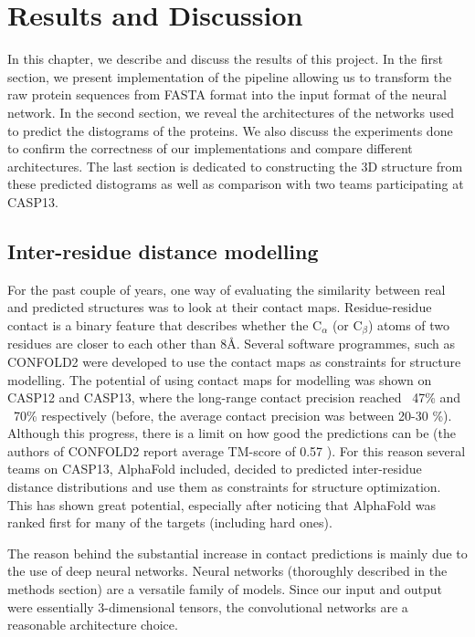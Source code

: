 \chapter{Results and Discussion}
In this chapter, we describe and discuss the results of this project.
In the first section, we present implementation of the pipeline allowing us to transform the raw protein sequences from FASTA format into the input format of the neural network.
In the second section, we reveal the architectures of the networks used to predict the distograms of the proteins.
We also discuss the experiments done to confirm the correctness of our implementations and compare different architectures.
The last section is dedicated to constructing the 3D structure from these predicted distograms as well as comparison with two teams participating at CASP13.



\newpage
\section{Inter-residue distance modelling}

For the past couple of years, one way of evaluating the similarity between real and predicted structures was to look at their contact maps. 
Residue-residue contact is a binary feature that describes whether the C$_\alpha$ (or C$_\beta$) atoms of two residues are closer to each other than 8\AA. 
Several software programmes, such as CONFOLD2 \cite{confold, confold2} were developed to use the contact maps as constraints for structure modelling. 
The potential of using contact maps for modelling was shown on CASP12 and CASP13, where the long-range contact precision reached ~47\% and ~70\% respectively (before, the average contact precision was between 20-30 \%). 
Although this progress, there is a limit on how good the predictions can be (the authors of CONFOLD2 report average TM-score of 0.57 \cite{confold2}). 
For this reason several teams on CASP13, AlphaFold included, decided to predicted inter-residue distance distributions and use them as constraints for structure optimization. 
This has shown great potential, especially after noticing that AlphaFold was ranked first for many of the targets (including hard ones).

The reason behind the substantial increase in contact predictions is mainly due to the use of deep neural networks. 
Neural networks (thoroughly described in the methods section) are a versatile family of models. 
Since our input and output were essentially 3-dimensional tensors, the convolutional networks are a reasonable architecture choice. 

